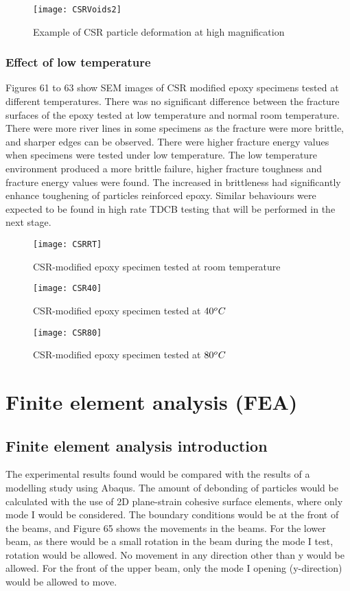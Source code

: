 \documentclass[numbers=noendperiod,chapterprefix=on]{icldt} %
\begin{document}
\begin{figure}[!htpb]
\centering
\texttt{[image: CSRVoids2]}
\caption{Example of CSR particle deformation at high magnification }
\end{figure}

\subsubsection{Effect of low temperature}
Figures 61 to 63 show SEM images of CSR modified epoxy specimens tested at different temperatures. There was no significant difference between the fracture surfaces of the epoxy tested at low temperature and normal room temperature. There were more river lines in some specimens as the fracture were more brittle, and sharper edges can be observed. There were higher fracture energy values when specimens were tested under low temperature. The low temperature environment produced a more brittle failure, higher fracture toughness and fracture energy values were found. The increased in brittleness had significantly enhance toughening of particles reinforced epoxy. Similar behaviours were expected to be found in high rate TDCB testing that will be performed in the next stage. 

\begin{figure}[!htpb]
\centering
\texttt{[image: CSRRT]}
\caption{CSR-modified epoxy specimen tested at room temperature }
\end{figure}

\begin{figure}[!htpb]
\centering
\texttt{[image: CSR40]}
\caption{CSR-modified epoxy specimen tested at $\-40 ^oC$}
\end{figure}

\begin{figure}[!htpb]
\centering
\texttt{[image: CSR80]}
\caption{CSR-modified epoxy specimen tested at  $\-80 ^oC$}
\end{figure}

\section{Finite element analysis (FEA)}
\subsection{Finite element analysis introduction}
The experimental results found would be compared with the results of a modelling study using Abaqus. The amount of debonding of particles would be calculated with the use of 2D plane-strain cohesive surface elements, where only mode I would be considered. The boundary conditions would be at the front of the beams, and Figure 65 shows the movements in the beams. For the lower beam, as there would be a small rotation in the beam during the mode I test, rotation would be allowed. No movement in any direction other than y would be allowed. For the front of the upper beam, only the mode I opening (y-direction) would be allowed to move. 
\end{document}
